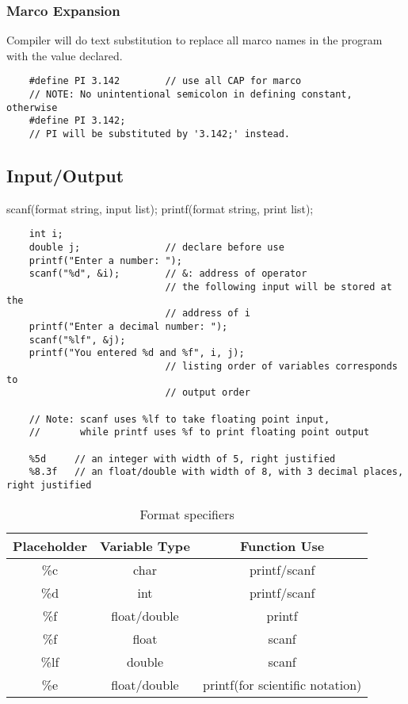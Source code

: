 \documentclass[12pt]{article} %
\begin{document}
\subsubsection{Marco Expansion}
Compiler will do text substitution to replace all marco names in the program with the value declared.
\begin{lstlisting}
    #define PI 3.142        // use all CAP for marco
    // NOTE: No unintentional semicolon in defining constant, otherwise
    #define PI 3.142;
    // PI will be substituted by '3.142;' instead.
\end{lstlisting}

\subsection{Input/Output}
scanf(format string, input list);
printf(format string, print list);

\begin{lstlisting}
    int i;
    double j;               // declare before use
    printf("Enter a number: ");
    scanf("%d", &i);        // &: address of operator
                            // the following input will be stored at the 
                            // address of i
    printf("Enter a decimal number: ");
    scanf("%lf", &j);
    printf("You entered %d and %f", i, j);
                            // listing order of variables corresponds to 
                            // output order

    // Note: scanf uses %lf to take floating point input,
    //       while printf uses %f to print floating point output

    %5d     // an integer with width of 5, right justified
    %8.3f   // an float/double with width of 8, with 3 decimal places, right justified
\end{lstlisting}

\begin{table}[h]
    \centering
    \begin{tabular}{|c|c|c|}
    \hline
    Placeholder & Variable Type & Function Use \\ \hline
    \%c & char & printf/scanf \\ \hline
    \%d & int & printf/scanf \\ \hline
    \%f & float/double & printf \\ \hline
    \%f & float & scanf \\ \hline
    \%lf & double & scanf \\ \hline
    \%e & float/double & printf(for scientific notation) \\ \hline

    \end{tabular}
    \caption{Format specifiers}
\end{table}
\end{document}
